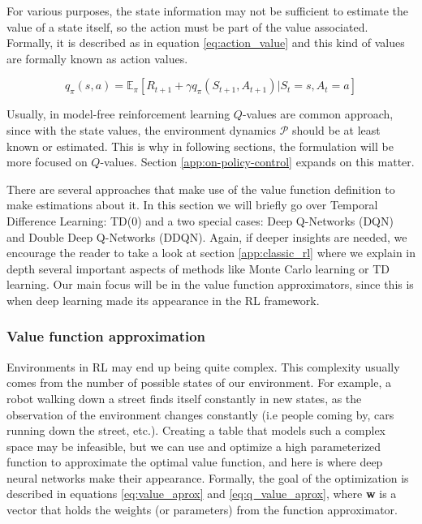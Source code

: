 For various purposes, the state information may not be sufficient to estimate the value of a state itself, so the action must be part of the value associated. Formally, it is described as in equation \ref{eq:action_value} and this kind of values are formally known as action values.

\begin{equation} \label{eq:action_value}
	q_{\pi}(s,a) = \mathbb{E}_{\pi}[R_{t+1} + \gamma q_{\pi}(S_{t+1},A_{t+1}) | S_t=s , A_t=a]
\end{equation}

Usually, in model-free reinforcement learning ${Q}$-values are common approach, since with the state values, the environment dynamics $\mathcal{P}$ should be at least known or estimated. This is why in following sections, the formulation will be more focused on ${Q}$-values. Section \ref{app:on-policy-control} expands on this matter.

There are several approaches that make use of the value function definition to make estimations about it. In this section we will briefly go over Temporal Difference Learning: TD(0) and a two special cases: Deep Q-Networks (DQN) \cite{mnih2013playing} and Double Deep Q-Networks \cite{vanhasselt2015deep} (DDQN). Again, if deeper insights are needed, we encourage the reader to take a look at section \ref{app:classic_rl} where we explain in depth several important aspects of methods like Monte Carlo learning or TD learning. Our main focus will be in the value function approximators, since this is when deep learning made its appearance in the RL framework.

\subsubsection{Value function approximation} 
\label{sec:val-fun_approx}

Environments in RL may end up being quite complex. This complexity usually comes from the number of possible states of our environment. For example, a robot walking down a street finds itself constantly in new states, as the observation of the environment changes constantly (i.e people coming by, cars running down the street, etc.). Creating a table that models such a complex space may be infeasible, but we can use and optimize a high parameterized function to approximate the optimal value function, and here is where deep neural networks make their appearance. Formally, the goal of the optimization is described in equations \ref{eq:value_aprox} and \ref{eq:q_value_aprox}, where \textbf{w} is a vector that holds the weights (or parameters) from the function approximator.

